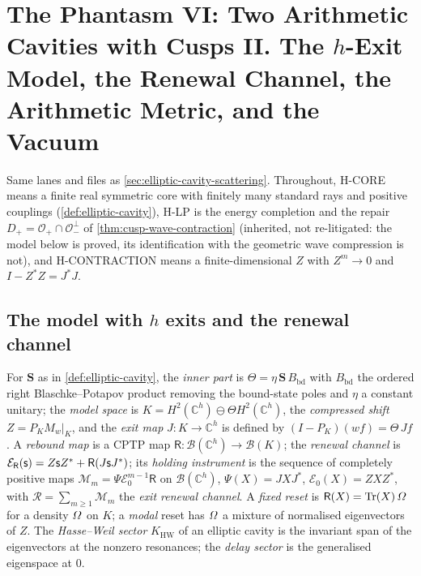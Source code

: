 \section{The Phantasm VI: Two Arithmetic Cavities with Cusps II. The $h$-Exit Model, the Renewal Channel, the Arithmetic Metric, and the Vacuum}
\label{sec:elliptic-cavity-channel}

Same lanes and files as \cref{sec:elliptic-cavity-scattering}. Throughout, H-CORE means a finite real
symmetric core with finitely many standard rays and positive couplings (\cref{def:elliptic-cavity}), H-LP is
the energy completion and the repair $D_+ = \mathcal O_+\cap\mathcal O_-^\perp$ of
\cref{thm:cusp-wave-contraction} (inherited, not re-litigated: the model below is proved, its
identification with the geometric wave compression is not), and H-CONTRACTION means a finite-dimensional
$Z$ with $Z^m\to0$ and $I-Z^{*}Z = J^{*}J$.

\subsection{The model with $h$ exits and the renewal channel}

\begin{definition}
\label{def:h-exit-renewal-channel}
For $\mathbf S$ as in \cref{def:elliptic-cavity}, the \emph{inner part} is $\Theta = \eta\,\mathbf S\,B_{\mathrm{bd}}$
with $B_{\mathrm{bd}}$ the ordered right Blaschke--Potapov product removing the bound-state poles and $\eta$ a
constant unitary; the \emph{model space} is $K = H^2(\mathbb C^h)\ominus\Theta H^2(\mathbb C^h)$, the
\emph{compressed shift} $Z = P_KM_w|_K$, and the \emph{exit map} $J:K\to\mathbb C^h$ is defined by
$(I-P_K)(wf) = \Theta\,Jf$. A \emph{rebound map} is a CPTP map $\mathsf R:\mathcal B(\mathbb C^h)\to\mathcal B(K)$;
the \emph{renewal channel} is $\mathcal E_{\mathsf R}(\mathsf s) = Z\mathsf s Z^{*}+\mathsf R(J\mathsf s J^{*})$; its
\emph{holding instrument} is the sequence of completely positive maps $\mathcal M_m = \Psi\mathcal E_0^{m-1}\mathsf R$
on $\mathcal B(\mathbb C^h)$, $\Psi(X) = JXJ^{*}$, $\mathcal E_0(X) = ZXZ^{*}$, with $\mathcal R = \sum_{m\ge1}\mathcal M_m$
the \emph{exit renewal channel}. A \emph{fixed reset} is $\mathsf R(X) = \mathrm{Tr}(X)\,\varOmega$ for a density $\varOmega$
on $K$; a \emph{modal} reset has $\varOmega$ a mixture of normalised eigenvectors of $Z$. The \emph{Hasse--Weil sector}
$K_{\mathrm{HW}}$ of an elliptic cavity is the invariant span of the eigenvectors at the nonzero resonances; the
\emph{delay sector} is the generalised eigenspace at $0$.
\end{definition}

